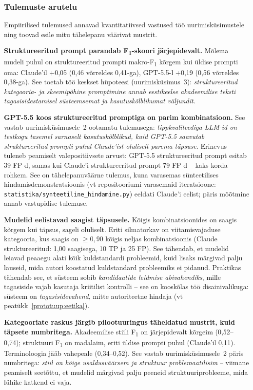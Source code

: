 \subsubsection{Tulemuste arutelu}

Empiirilised tulemused annavad kvantitatiivsed vastused töö uurimisküsimustele ning toovad esile mitu tähelepanu väärivat mustrit.

\textbf{Struktureeritud prompt parandab F\textsubscript{1}-skoori järjepidevalt.} Mõlema mudeli puhul on struktureeritud prompti makro-F\textsubscript{1} kõrgem kui üldise prompti oma: Claude'il +0,05 (0,46 võrreldes 0,41-ga), GPT-5.5-l +0,19 (0,56 võrreldes 0,38-ga). See toetab töö keskset hüpoteesi (uurimisküsimus~3): \emph{struktureeritud kategooria- ja skeemipõhine promptimine annab eestikeelse akadeemilise teksti tagasisidestamisel süsteemsemat ja kasutuskõlblikumat väljundit}.

\textbf{GPT-5.5 koos struktureeritud promptiga on parim kombinatsioon.} See vastab uurimisküsimusele~2 ootamatu tulemusega: \emph{tippkvaliteediga LLM-id on testkogu tasemel sarnaselt kasutuskõlblikud, kuid GPT-5.5 saavutab struktureeritud prompti puhul Claude'ist oluliselt parema täpsuse}. Erinevus tuleneb peamiselt valepositiivsete arvust: GPT-5.5 struktureeritud prompt esitab 39 FP-d, samas kui Claude'i struktureeritud prompt 79 FP-d -- kaks korda rohkem. See on tähelepanuväärne tulemus, kuna varasemas sünteetilises hindamisdemonstratsioonis (vt repositooriumi varasemaid iteratsioone: \texttt{statistika/synteetiline\_hindamine.py}) eeldati Claude'i eelist; päris mõõtmine annab vastupidise tulemuse.

\textbf{Mudelid eelistavad saagist täpsusele.} Kõigis kombinatsioonides on saagis kõrgem kui täpsus, sageli oluliselt. Eriti silmatorkav on viitamisvajaduse kategooria, kus saagis on $\geq 0{,}90$ kõigis neljas kombinatsioonis (Claude struktureeritud: 1,00 saagisega, 10 TP ja 25 FP). See tähendab, et mudelid leiavad peaaegu alati kõik kuldstandardi probleemid, kuid lisaks märgivad palju lauseid, mida autori koostatud kuldstandard probleemiks ei pidanud. Praktikas tähendab see, et süsteem sobib \emph{kandidaatide leidmise abivahendiks}, mille tagasiside vajab kasutaja kriitilist kontrolli -- see on kooskõlas töö disainivalikuga: süsteem on \emph{tagasisidevahend}, mitte autoriteetne hindaja (vt peatükk~\ref{prototuup:eetika}).

\textbf{Kategooriate raskus järgib pilootuuringus täheldatud mustrit, kuid täpsete numbritega.} Akadeemilise stiili F\textsubscript{1} on järjepidevalt kõrgeim (0,52--0,74); struktuuri F\textsubscript{1} on madalaim, eriti üldise prompti puhul (Claude'il 0,11). Terminoloogia jääb vahepeale (0,34--0,52). See vastab uurimisküsimusele~2 päris numbritega: \emph{stiil on kõige usaldusväärsem ja struktuur problemaatilisim} -- viimane peamiselt seetõttu, et mudelid märgivad palju peeneid struktuuriprobleeme, mida lühike katkend ei vaja.

